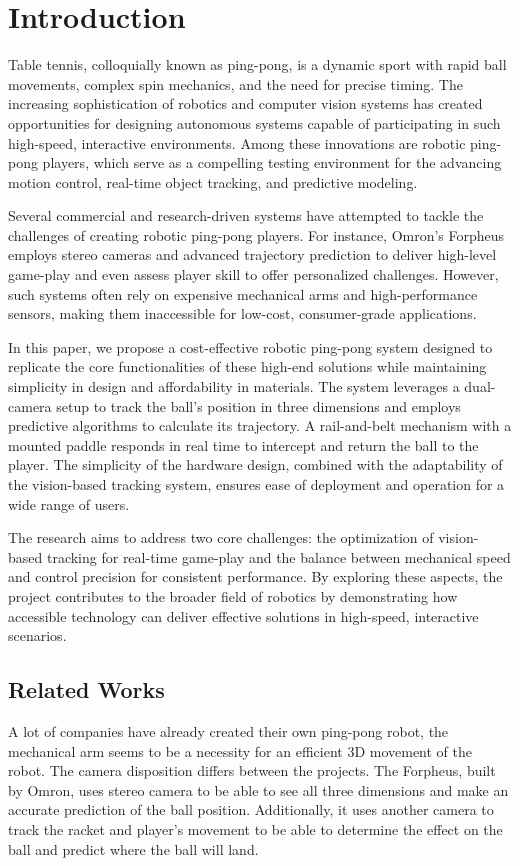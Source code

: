 \chapter{Introduction}

Table tennis, colloquially known as ping-pong, is a dynamic sport with rapid ball movements, complex spin mechanics, and the need for precise timing. The increasing sophistication of robotics and computer vision systems has created opportunities for designing autonomous systems capable of participating in such high-speed, interactive environments. Among these innovations are robotic ping-pong players, which serve as a compelling testing environment for the advancing motion control, real-time object tracking, and predictive modeling.

Several commercial and research-driven systems have attempted to tackle the challenges of creating robotic ping-pong players. For instance, Omron's Forpheus employs stereo cameras and advanced trajectory prediction to deliver high-level game-play and even assess player skill to offer personalized challenges.\cite{Kyohei2019} However, such systems often rely on expensive mechanical arms and high-performance sensors, making them inaccessible for low-cost, consumer-grade applications.

In this paper, we propose a cost-effective robotic ping-pong system designed to replicate the core functionalities of these high-end solutions while maintaining simplicity in design and affordability in materials. The system leverages a dual-camera setup to track the ball's position in three dimensions and employs predictive algorithms to calculate its trajectory. A rail-and-belt mechanism with a mounted paddle responds in real time to intercept and return the ball to the player. The simplicity of the hardware design, combined with the adaptability of the vision-based tracking system, ensures ease of deployment and operation for a wide range of users.

The research aims to address two core challenges: the optimization of vision-based tracking for real-time game-play and the balance between mechanical speed and control precision for consistent performance. By exploring these aspects, the project contributes to the broader field of robotics by demonstrating how accessible technology can deliver effective solutions in high-speed, interactive scenarios.

\section{Related Works}
A lot of companies have already created their own ping-pong robot, the mechanical arm seems to be a necessity for an efficient 3D movement of the robot. The camera disposition differs between the projects. The Forpheus, built by Omron, \cite{Kyohei2019} uses stereo camera to be able to see all three dimensions and make an accurate prediction of the ball position. Additionally, it uses another camera to track the racket and player's movement to be able to determine the effect on the ball and predict where the ball will land.

